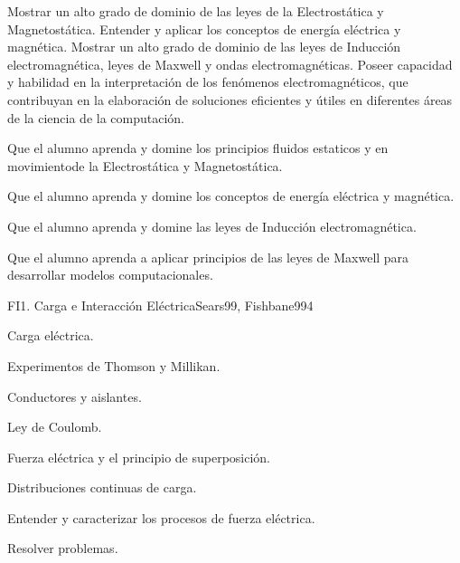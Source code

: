 \begin{syllabus}


\begin{justification}
Mostrar un alto grado de dominio de las leyes de la Electrostática y Magnetostática. Entender y aplicar los conceptos de energía eléctrica y magnética. Mostrar un alto grado de dominio de las leyes de Inducción electromagnética, leyes de Maxwell y ondas electromagnéticas. Poseer capacidad y habilidad en la interpretación de los fenómenos electromagnéticos, que contribuyan en la elaboración de soluciones eficientes y útiles en diferentes áreas de la ciencia de la computación. 
\end{justification}

\begin{goals}
\item  Que el alumno aprenda y domine los principios fluidos estaticos y en movimientode la Electrostática y Magnetostática.
\item  Que el alumno aprenda y domine los conceptos de energía eléctrica y magnética.
\item  Que el alumno aprenda y domine las leyes de Inducción electromagnética.
\item  Que el alumno aprenda a aplicar principios de las leyes de Maxwell para desarrollar modelos computacionales.
\end{goals}

\begin{outcomes}
\end{outcomes}

\begin{unit}{FI1. Carga e Interacción Eléctrica}{Sears99, Fishbane99}{4}
   \begin{topics}
         \item  Carga eléctrica.
	 \item  Experimentos de Thomson y Millikan.
         \item  Conductores y aislantes.
	 \item  Ley de Coulomb.
         \item  Fuerza eléctrica y el principio de superposición.
         \item  Distribuciones continuas de carga.
   \end{topics}

   \begin{unitgoals}
         \item  Entender y caracterizar los procesos de fuerza eléctrica.
         \item  Resolver problemas.
   \end{unitgoals}
\end{unit}


\end{syllabus}
